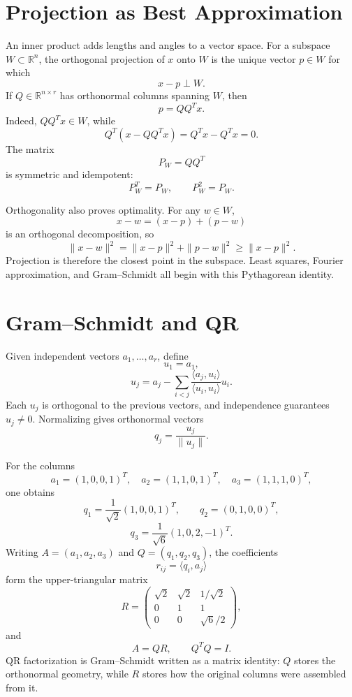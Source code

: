 \section{Projection as Best Approximation}

An inner product adds lengths and angles to a vector space.  For a subspace \(W\subset\mathbb R^n\), the orthogonal projection of \(x\) onto \(W\) is the unique vector \(p\in W\) for which
\[
  x-p\perp W.
\]
If \(Q\in\mathbb R^{n\times r}\) has orthonormal columns spanning \(W\), then
\[
  p=QQ^Tx.
\]
Indeed, \(QQ^Tx\in W\), while
\[
  Q^T(x-QQ^Tx)=Q^Tx-Q^Tx=0.
\]
The matrix
\[
  P_W=QQ^T
\]
is symmetric and idempotent:
\[
  P_W^T=P_W,
  \qquad
  P_W^2=P_W.
\]

Orthogonality also proves optimality.  For any \(w\in W\),
\[
  x-w=(x-p)+(p-w)
\]
is an orthogonal decomposition, so
\[
  \|x-w\|^2
  =\|x-p\|^2+\|p-w\|^2
  \ge\|x-p\|^2.
\]
Projection is therefore the closest point in the subspace.  Least squares, Fourier approximation, and Gram--Schmidt all begin with this Pythagorean identity.

\section{Gram--Schmidt and QR}

Given independent vectors \(a_1,\ldots,a_r\), define
\[
  u_1=a_1,
\]
\[
  u_j=a_j-
  \sum_{i<j}
  \frac{\langle a_j,u_i\rangle}
       {\langle u_i,u_i\rangle}u_i.
\]
Each \(u_j\) is orthogonal to the previous vectors, and independence guarantees \(u_j\ne0\).  Normalizing gives orthonormal vectors
\[
  q_j=\frac{u_j}{\|u_j\|}.
\]

For the columns
\[
  a_1=(1,0,0,1)^T,
  \quad
  a_2=(1,1,0,1)^T,
  \quad
  a_3=(1,1,1,0)^T,
\]
one obtains
\[
  q_1=\frac1{\sqrt2}(1,0,0,1)^T,
  \qquad
  q_2=(0,1,0,0)^T,
\]
\[
  q_3=\frac1{\sqrt6}(1,0,2,-1)^T.
\]
Writing \(A=(a_1,a_2,a_3)\) and \(Q=(q_1,q_2,q_3)\), the coefficients
\[
  r_{ij}=\langle q_i,a_j\rangle
\]
form the upper-triangular matrix
\[
  R=
  \begin{pmatrix}
    \sqrt2&\sqrt2&1/\sqrt2\\
    0&1&1\\
    0&0&\sqrt6/2
  \end{pmatrix},
\]
and
\[
  \boxed{A=QR,\qquad Q^TQ=I.}
\]
QR factorization is Gram--Schmidt written as a matrix identity: \(Q\) stores the orthonormal geometry, while \(R\) stores how the original columns were assembled from it.

